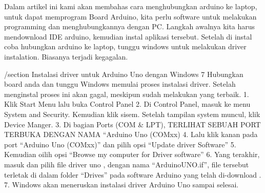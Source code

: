
Dalam artikel ini kami akan membahas cara menghubungkan arduino ke laptop, untuk dapat memprogram Board Arduino, kita perlu software untuk melakukan programming dan menghubungkannya dengan PC. Langkah awalnya kita harus mendownload IDE arduino, kemudian instal aplikasi tersebut. Setelah di instal coba hubungkan arduino ke laptop, tunggu windows untuk melakukan driver instalation. Biasanya terjadi kegagalan.

/section
Instalasi driver untuk Arduino Uno dengan Windows 7
Hubungkan board anda dan tunggu Windows memulai proses instalasi driver. Setelah menginstal proses ini akan gagal, meskipun sudah melakukan yang terbaik.
1.	Klik Start Menu lalu buka Control Panel
2.	Di Control Panel, masuk ke menu System and Security. Kemudian klik sisem. Setelah tampilan system muncul, klik Device Manger.
3.	Di bagian Ports (COM & LPT), TERLIHAT SEBUAH PORT TERBUKA DENGAN NAMA “Arduino Uno (COMxx)
4.	Lalu klik kanan pada port “Arduino Uno (COMxx)” dan pilih opsi “Update driver Software”
5.	Kemudian oilih opsi “Browse my computer for Driver software”
6.	Yang terakhir, masuk dan pilih file driver uno , dengan nama “ArduinoUNO.if”, file tersebut terletak di dalam folder “Drives” pada software Arduino yang telah di-download .
7.	Windows akan meneruskan instalasi driver Arduino Uno sampai selesai.
